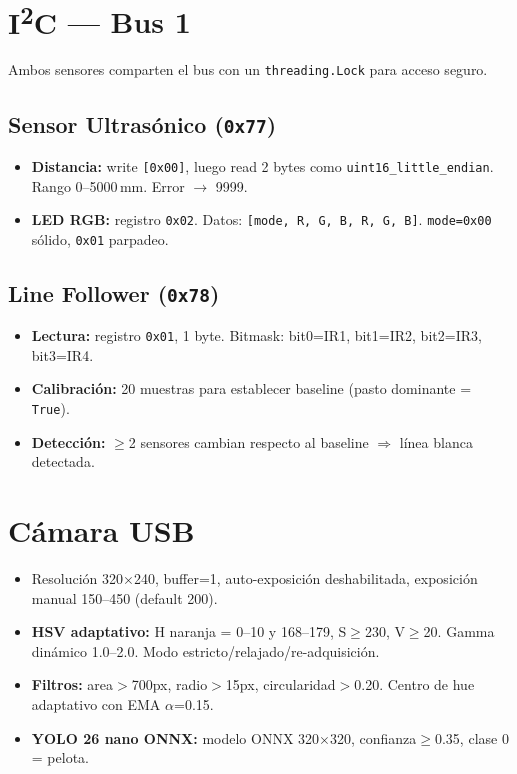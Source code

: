 \documentclass[11pt,a4paper]{article}
\begin{document}
\section{\textcolor{i2ccolor}{I\textsuperscript{2}C} --- Bus 1}

Ambos sensores comparten el bus con un \texttt{threading.Lock} para acceso seguro.

\subsection{Sensor Ultras\'{o}nico (\texttt{0x77})}

\begin{itemize}[nosep,leftmargin=1.5em]
  \item \textbf{Distancia:} write \texttt{[0x00]}, luego read 2 bytes como \texttt{uint16\_little\_endian}. Rango 0--5000\,mm. Error $\rightarrow$ 9999.
  \item \textbf{LED RGB:} registro \texttt{0x02}. Datos: \texttt{[mode, R, G, B, R, G, B]}. \texttt{mode=0x00} s\'{o}lido, \texttt{0x01} parpadeo.
\end{itemize}

\subsection{Line Follower (\texttt{0x78})}

\begin{itemize}[nosep,leftmargin=1.5em]
  \item \textbf{Lectura:} registro \texttt{0x01}, 1 byte. Bitmask: bit0=IR1, bit1=IR2, bit2=IR3, bit3=IR4.
  \item \textbf{Calibraci\'{o}n:} 20 muestras para establecer baseline (pasto dominante = \texttt{True}).
  \item \textbf{Detecci\'{o}n:} $\geq$2 sensores cambian respecto al baseline $\Rightarrow$ l\'{i}nea blanca detectada.
\end{itemize}


\section{\textcolor{usbcolor}{C\'{a}mara USB}}

\begin{itemize}[nosep,leftmargin=1.5em]
  \item Resoluci\'{o}n 320$\times$240, buffer=1, auto-exposici\'{o}n deshabilitada, exposici\'{o}n manual 150--450 (default 200).
  \item \textbf{HSV adaptativo:} H naranja = 0--10 y 168--179, S$\geq$230, V$\geq$20. Gamma din\'{a}mico 1.0--2.0. Modo estricto/relajado/re-adquisici\'{o}n.
  \item \textbf{Filtros:} area$>$700px, radio$>$15px, circularidad$>$0.20. Centro de hue adaptativo con EMA $\alpha$=0.15.
  \item \textbf{YOLO 26 nano ONNX:} modelo ONNX 320$\times$320, confianza$\geq$0.35, clase 0 = pelota.
\end{itemize}
\end{document}
